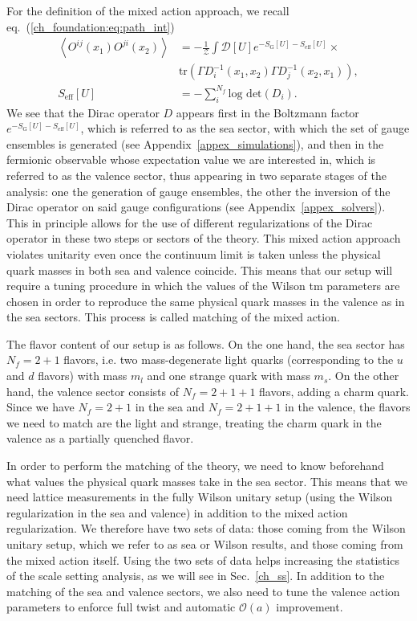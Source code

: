 For the definition of the mixed action approach, we recall eq.~(\ref{ch_foundation:eq:path_int})
\begin{align}
\left<O^{ij}(x_1)O^{ji}(x_2)\right>&=-\frac{1}{\mathcal{Z}}\int\mathcal{D}[U]e^{-S_{\textrm{G}}[U]-S_{\textrm{eff}}[U]}\times\\&{\textrm{tr}}\left(\Gamma D_i^{-1}(x_1,x_2)\Gamma D_j^{-1}(x_2,x_1)\right),\\
S_{\textrm{eff}}[U]&=-\sum_i^{N_f}\textrm{log det}(D_i).
\end{align} 
We see that the Dirac operator $D$ appears first in the Boltzmann factor $e^{-S_{\textrm{G}}[U]-S_{\textrm{eff}}[U]}$, which is referred to as the sea sector, with which the set of gauge ensembles is generated (see Appendix~\ref{appex_simulations}), and then in the fermionic observable whose expectation value we are interested in, which is referred to as the valence sector, thus appearing in two separate stages of the analysis: one the generation of gauge ensembles, the other the inversion of the Dirac operator on said gauge configurations (see Appendix~\ref{appex_solvers}). This in principle allows for the use of different regularizations of the Dirac operator in these two steps or sectors of the theory. This mixed action approach violates unitarity even once the continuum limit is taken unless the physical quark masses in both sea and valence coincide. This means that our setup will require a tuning procedure in which the values of the Wilson tm parameters are chosen in order to reproduce the same physical quark masses in the valence as in the sea sectors. This process is called matching of the mixed action. 

The flavor content of our setup is as follows. On the one hand, the sea sector has $N_f=2+1$ flavors, i.e. two mass-degenerate light quarks (corresponding to the $u$ and $d$ flavors) with mass $m_l$ and one strange quark with mass $m_s$. On the other hand, the valence sector consists of $N_f=2+1+1$ flavors, adding a charm quark. Since we have $N_f=2+1$ in the sea and $N_f=2+1+1$ in the valence, the flavors we need to match are the light and strange, treating the charm quark in the valence as a partially quenched flavor. 

In order to perform the matching of the theory, we need to know beforehand what values the physical quark masses take in the sea sector. This means that we need lattice measurements in the fully Wilson unitary setup (using the Wilson regularization in the sea and valence) in addition to the mixed action regularization. We therefore have two sets of data: those coming from the Wilson unitary setup, which we refer to as sea or Wilson results, and those coming from the mixed action itself. Using the two sets of data helps increasing the statistics of the scale setting analysis, as we will see in Sec.~\ref{ch_ss}. In addition to the matching of the sea and valence sectors, we also need to tune the valence action parameters to enforce full twist and automatic $\mathcal{O}(a)$ improvement.

